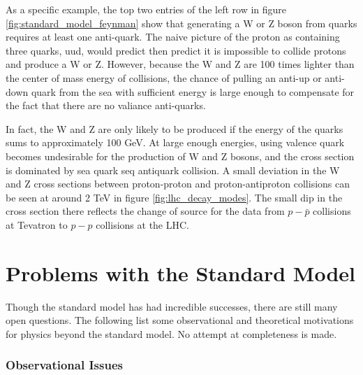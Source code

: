     As a specific example, the top two entries of the left row in figure \ref{fig:standard_model_feynman} show that generating a W or Z boson from quarks requires at least one anti-quark. The naive picture of the proton as containing three quarks, uud, would predict then predict it is impossible to collide protons and produce a W or Z. However, because the W and Z are 100 times lighter than the center of mass energy of collisions, the chance of pulling an anti-up or anti-down quark from the sea with sufficient energy is large enough to compensate for the fact that there are no valiance anti-quarks. 

    In fact, the W and Z are only likely to be produced if the energy of the quarks sums to approximately 100 GeV. At large enough energies, using valence quark becomes undesirable for the production of W and Z bosons, and the cross section is dominated by sea quark seq antiquark collision. A small deviation in the W and Z cross sections between proton-proton and proton-antiproton collisions can be seen at around 2 TeV in figure \ref{fig:lhc_decay_modes}. The small dip in the cross section there reflects the change of source for the data from $p-\bar{p}$ collisions at Tevatron to $p-p$ collisions at the LHC.

\section{Problems with the Standard Model} \label{sec:problems_with_sm}
  Though the standard model has had incredible successes, there are still many open questions. The following list some observational and theoretical motivations for physics beyond the standard model. No attempt at completeness is made.

  \subsubsection{Observational Issues} \label{sec:observational_issues_with_sm}

